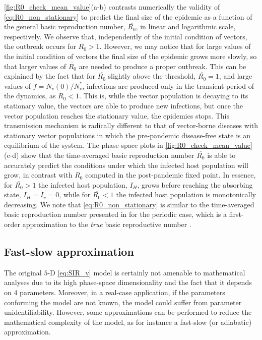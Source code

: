 \cref{fig:R0_check_mean_value}(a-b) contrasts numerically the validity of
\cref{eq:R0_non_stationary} to predict the final size of the epidemic as a
function of the general basic reproduction number, $\overline{R_0}$, in linear
and logarithmic scale, respectively. We observe that, independently of the
initial condition of vectors, the outbreak occurs for $\overline{R_0}>1$.
However, we may notice that for large values of the initial condition of
vectors the final size of the epidemic grows more slowly, so that larger values
of $\overline{R_0}$ are needed to produce a proper outbreak. This can be
explained by the fact that for $\overline{R_0}$ slightly above the threshold,
$\overline{R_0}=1$, and large values of $f=N_v(0)/N_v^*$, infections are
produced only in the transient period of the dynamics, as $R_0<1$. This is,
while the vector population is decaying to its stationary value, the vectors
are able to produce new infections, but once the vector population reaches the
stationary value, the epidemics stops. This transmission mechanism is radically
different to that of vector-borne diseases with stationary vector populations
in which the pre-pandemic disease-free state is an equilibrium of the system.
The phase-space plots in \cref{fig:R0_check_mean_value}(c-d) show that the
time-averaged basic reproduction number $\overline{R_0}$ is able to accurately
predict the conditions under which the infected host population will grow, in
contrast with $R_0$ computed in the post-pandemic fixed point. In essence, for
$\overline{R_0}>1$ the infected host population, $I_H$, grows before reaching
the absorbing state, $I_H=I_v=0$, while for $\overline{R_0}<1$ the infected
host population is monotonically decreasing. We note that
\cref{eq:R0_non_stationary} is similar to the time-averaged basic reproduction
number presented in \cite{Wesley2009} for the periodic case, which is a
first-order approximation to the \textit{true} basic reproductive number
\cite{Bacaer2006}.

\subsection{Fast-slow approximation}

The original $5$-D \cref{eq:SIR_v} model is certainly not amenable to
mathematical analyses due to its high phase-space dimensionality and the fact
that it depends on $4$ parameters. Moreover, in a real-case application, if the
parameters conforming the model are not known, the model could suffer from
parameter unidentifiability. However, some approximations can be performed to
reduce the mathematical complexity of the model, as for instance a fast-slow
(or adiabatic) approximation.

